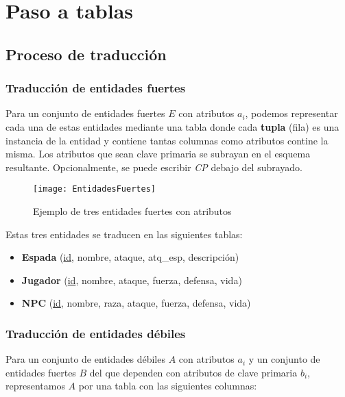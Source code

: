 \chapter{Paso a tablas}

\section{Proceso de traducción}

\subsection{Traducción de entidades fuertes}

Para un conjunto de entidades fuertes $E$ con atributos $a_i$, podemos representar cada una de estas entidades mediante una tabla donde cada \textbf{tupla} (fila) es una instancia de la entidad y contiene tantas columnas como atributos contine la misma.
Los atributos que sean clave primaria se subrayan en el esquema resultante.
Opcionalmente, se puede escribir \textit{CP} debajo del subrayado.

\begin{figure}[h]
\begin{center}
	\texttt{[image: EntidadesFuertes]}
\end{center}
\caption{Ejemplo de tres entidades fuertes con atributos}
\end{figure}

Estas tres entidades se traducen en las siguientes tablas:

\begin{itemize}
	\item \textbf{Espada} (\underline{id}, nombre, ataque, atq\_esp, descripción)
	\item \textbf{Jugador} (\underline{id}, nombre, ataque, fuerza, defensa, vida)
	\item \textbf{NPC} (\underline{id}, nombre, raza, ataque, fuerza, defensa, vida)
\end{itemize}

\subsection{Traducción de entidades débiles}

Para un conjunto de entidades débiles $A$ con atributos $a_i$ y un conjunto de entidades fuertes $B$ del que dependen con atributos de clave primaria $b_i$, representamos $A$ por una tabla con las siguientes columnas:

